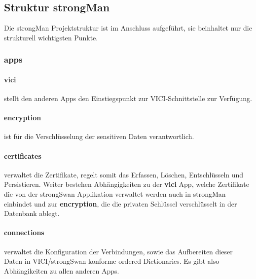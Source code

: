 \subsection{Struktur strongMan}
Die strongMan Projektstruktur ist im Anschluss aufgeführt, sie beinhaltet nur die strukturell wichtigsten Punkte.\\
\begin{figure}[H]
\end{figure}

\medskip

\subsubsection{apps}
\par
\begingroup
\leftskip=0.5cm 
\noindent
\paragraph{vici} stellt den anderen Apps den Einstiegspunkt zur VICI-Schnittstelle zur Verfügung. 

\paragraph{encryption} ist für die Verschlüsselung der sensitiven Daten verantwortlich.

\paragraph{certificates} verwaltet die Zertifikate, regelt somit das Erfassen, Löschen, Entschlüsseln und Persistieren. Weiter bestehen Abhängigkeiten zu der \textbf{vici} App, welche Zertifikate die von der strongSwan Applikation
verwaltet werden auch in strongMan einbindet und zur \textbf{encryption}, die die privaten Schlüssel verschlüsselt in der Datenbank ablegt.

\paragraph{connections} verwaltet die Konfiguration der Verbindungen, sowie das Aufbereiten dieser Daten in VICI/strongSwan konforme ordered Dictionaries. Es gibt also Abhängikeiten zu allen anderen Apps.

\par
\endgroup

